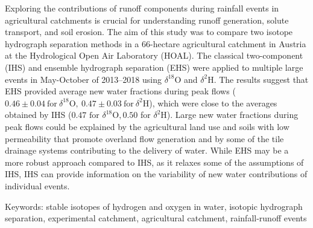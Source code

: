 \noindent

Exploring the contributions of runoff components during rainfall events in agricultural catchments is crucial for understanding runoff generation, solute transport, and soil erosion. The aim of this study was to compare two isotope hydrograph separation methods in a 66-hectare agricultural catchment in Austria at the Hydrological Open Air Laboratory (HOAL). The classical two-component (IHS) and ensemble hydrograph separation (EHS) were applied to multiple large events in May-October of 2013–2018 using $\delta^{18}\textrm{O}$ and $\delta^2\textrm{H}$. The results suggest that EHS provided average new water fractions during peak flows ($0.46\pm0.04\ \textrm{for}\ \delta^{18}\textrm{O},\ 0.47\pm0.03\ \textrm{for}\ \delta^2\textrm{H}$), which were close to the averages obtained by IHS ($0.47 \textrm{ for } \delta^{18}\textrm{O}, 0.50$ for $\delta^2\textrm{H}$). Large new water fractions during peak flows could be explained by the agricultural land use and soils with low permeability that promote overland flow generation and by some of the tile drainage systems contributing to the delivery of water. While EHS may be a more robust approach compared to IHS, as it relaxes some of the assumptions of IHS, IHS can provide information on the variability of new water contributions of individual events.

Keywords: stable isotopes of hydrogen and oxygen in water, isotopic hydrograph separation, experimental catchment, agricultural catchment, rainfall-runoff events

\newpage{}
{}
\begin{flushleft}





\end{flushleft}

\noindent

